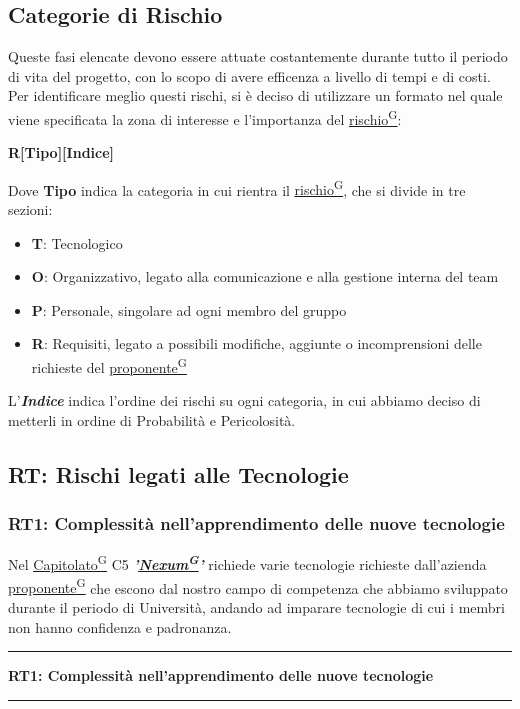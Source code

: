 \documentclass[a4paper,12pt]{article}
\providecommand{\glslink}[2]{\href{https://alittlebyte-19.github.io/Documentazione/glossario.html\#gls-#1}{\underline{#2}\textsuperscript{\scriptsize G}}}
\begin{document}
\subsection{Categorie di Rischio}
Queste fasi elencate devono essere attuate costantemente durante tutto il periodo di vita del progetto, con lo scopo di avere efficenza a livello di tempi e di costi.
Per identificare meglio questi rischi, si è deciso di utilizzare un formato nel quale viene specificata la zona di interesse e l'importanza del \glslink{rischio}{rischio}:
\begin{center}
    \textbf{R[Tipo][Indice]}
\end{center}
Dove \textbf{Tipo} indica la categoria in cui rientra il \glslink{rischio}{rischio}, che si divide in tre sezioni:
\begin{itemize}
    \item \textbf{T}: Tecnologico
    \item \textbf{O}: Organizzativo, legato alla comunicazione e alla gestione interna del team
    \item \textbf{P}: Personale, singolare ad ogni membro del gruppo
    \item \textbf{R}: Requisiti, legato a possibili modifiche, aggiunte o incomprensioni delle richieste del \glslink{committente-proponente}{proponente}
\end{itemize}
L'\textbf{\textit{Indice}} indica l'ordine dei rischi su ogni categoria, in cui abbiamo deciso di metterli in ordine di Probabilità e Pericolosità.

\newpage
\subsection{RT: Rischi legati alle Tecnologie}
\subsubsection{RT1: Complessità nell'apprendimento delle nuove tecnologie}
Nel \glslink{capitolato}{Capitolato} C5 \textbf{\textit{'\glslink{nexum}{Nexum}'}} richiede varie tecnologie richieste dall'azienda \glslink{committente-proponente}{proponente} che escono dal nostro campo di competenza che abbiamo sviluppato durante il periodo di Università, andando ad imparare tecnologie di cui i membri non hanno confidenza e padronanza.

\vspace{0.5cm}
\hrule
\vspace{0.5em}
\textbf{RT1: Complessità nell'apprendimento delle nuove tecnologie}
\vspace{0.5em}
\hrule
\vspace{1cm}
\end{document}
